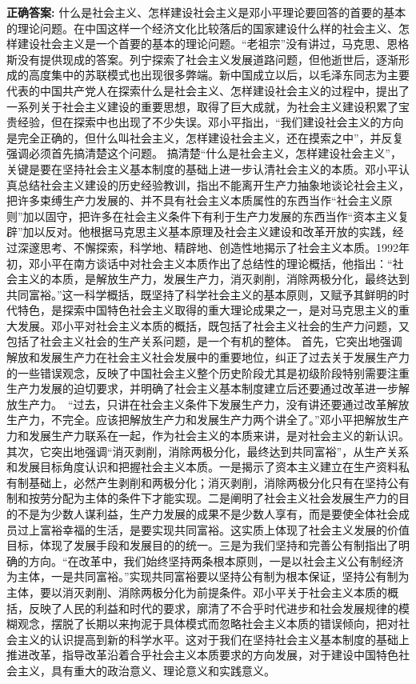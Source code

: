 \documentclass[12pt,UTF8]{ctexart}
\begin{document}
\textbf{正确答案:}
什么是社会主义、怎样建设社会主义是邓小平理论要回答的首要的基本的理论问题。在中国这样一个经济文化比较落后的国家建设什么样的社会主义、怎样建设社会主义是一个首要的基本的理论问题。“老祖宗”没有讲过，马克思、恩格斯没有提供现成的答案。列宁探索了社会主义发展道路问题，但他逝世后，逐渐形成的高度集中的苏联模式也出现很多弊端。新中国成立以后，以毛泽东同志为主要代表的中国共产党人在探索什么是社会主义、怎样建设社会主义的过程中，提出了一系列关于社会主义建设的重要思想，取得了巨大成就，为社会主义建设积累了宝贵经验，但在探索中也出现了不少失误。邓小平指出，“我们建设社会主义的方向是完全正确的，但什么叫社会主义，怎样建设社会主义，还在摸索之中”，并反复强调必须首先搞清楚这个问题。
搞清楚“什么是社会主义，怎样建设社会主义”，关键是要在坚持社会主义基本制度的基础上进一步认清社会主义的本质。邓小平认真总结社会主义建设的历史经验教训，指出不能离开生产力抽象地谈论社会主义，把许多束缚生产力发展的、并不具有社会主义本质属性的东西当作“社会主义原则”加以固守，把许多在社会主义条件下有利于生产力发展的东西当作“资本主义复辟”加以反对。他根据马克思主义基本原理及社会主义建设和改革开放的实践，经过深邃思考、不懈探索，科学地、精辟地、创造性地揭示了社会主义本质。1992年初，邓小平在南方谈话中对社会主义本质作出了总结性的理论概括，他指出：“社会主义的本质，是解放生产力，发展生产力，消灭剥削，消除两极分化，最终达到共同富裕。”这一科学概括，既坚持了科学社会主义的基本原则，又赋予其鲜明的时代特色，是探索中国特色社会主义取得的重大理论成果之一，是对马克思主义的重大发展。邓小平对社会主义本质的概括，既包括了社会主义社会的生产力问题，又包括了社会主义社会的生产关系问题，是一个有机的整体。
首先，它突出地强调解放和发展生产力在社会主义社会发展中的重要地位，纠正了过去关于发展生产力的一些错误观念，反映了中国社会主义整个历史阶段尤其是初级阶段特别需要注重生产力发展的迫切要求，并明确了社会主义基本制度建立后还要通过改革进一步解放生产力。 “过去，只讲在社会主义条件下发展生产力，没有讲还要通过改革解放生产力，不完全。应该把解放生产力和发展生产力两个讲全了。”邓小平把解放生产力和发展生产力联系在一起，作为社会主义的本质来讲，是对社会主义的新认识。其次，它突出地强调“消灭剥削，消除两极分化，最终达到共同富裕”，从生产关系和发展目标角度认识和把握社会主义本质。一是揭示了资本主义建立在生产资料私有制基础上，必然产生剥削和两极分化；消灭剥削，消除两极分化只有在坚持公有制和按劳分配为主体的条件下才能实现。二是阐明了社会主义社会发展生产力的目的不是为少数人谋利益，生产力发展的成果不是少数人享有，而是要使全体社会成员过上富裕幸福的生活，是要实现共同富裕。这实质上体现了社会主义发展的价值目标，体现了发展手段和发展目的的统一。三是为我们坚持和完善公有制指出了明确的方向。“在改革中，我们始终坚持两条根本原则，一是以社会主义公有制经济为主体，一是共同富裕。”实现共同富裕要以坚持公有制为根本保证，坚持公有制为主体，要以消灭剥削、消除两极分化为前提条件。邓小平关于社会主义本质的概括，反映了人民的利益和时代的要求，廓清了不合乎时代进步和社会发展规律的模糊观念，摆脱了长期以来拘泥于具体模式而忽略社会主义本质的错误倾向，把对社会主义的认识提高到新的科学水平。这对于我们在坚持社会主义基本制度的基础上推进改革，指导改革沿着合乎社会主义本质要求的方向发展，对于建设中国特色社会主义，具有重大的政治意义、理论意义和实践意义。
\end{document}
